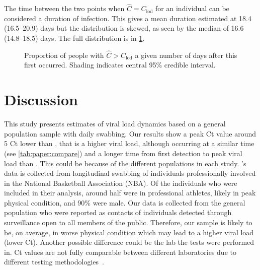 \documentclass[thesis.tex]{subfiles}
\begin{document}
The time between the two points when $\hat{C} = C_\text{lod}$ for an individual can be considered a duration of infection.
This gives a mean duration estimated at 18.4 (16.5--20.9) days but the distribution is skewed, as seen by the median of 16.6 (14.8--18.5) days.
The full distribution is in \cref{fig:paper:duration}.
\begin{figure}
    \centering
    \caption[Proportion of population positive]{Proportion of people with $\hat{C} > C_\text{lod}$ a given number of days after this first occurred. Shading indicates central 95\% credible interval.}
    \label{fig:paper:duration}
\end{figure}

\section{Discussion}

This study presents estimates of viral load dynamics based on a general population sample with daily swabbing.
Our results show a peak Ct value around 5 Ct lower than \textcite{kisslerViral}, that is a higher viral load, although occurring at a similar time (see \cref{tab:paper:compare}) and a longer time from first detection to peak viral load than \textcite{jonesEstimating}.
This could be because of the different populations in each study. \Textcite{kisslerViral}'s data is collected from longitudinal swabbing of individuals professionally involved in the National Basketball Association (NBA).
Of the individuals who were included in their analysis, around half were in professional athletes, likely in peak physical condition, and 90\% were male.
Our data is collected from the general population who were reported as contacts of individuals detected through surveillance open to all members of the public.
Therefore, our sample is likely to be, on average, in worse physical condition which may lead to a higher viral load (lower Ct).
Another possible difference could be the lab the tests were performed in.
Ct values are not fully comparable between different laboratories due to different testing methodologies~\autocites{dahdouhCt,hanRTPCR}.
\end{document}
